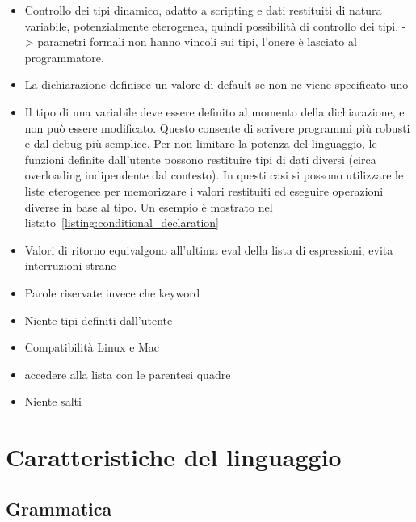 \documentclass[10pt]{article}
\begin{document}
\begin{itemize}
	\item Controllo dei tipi dinamico, adatto a scripting e dati restituiti di natura variabile, potenzialmente eterogenea, quindi possibilità di controllo dei tipi. -> parametri formali non hanno vincoli sui tipi, l'onere è lasciato al programmatore.
	\item La dichiarazione definisce un valore di default se non ne viene specificato uno
	\item Il tipo di una variabile deve essere definito al momento della dichiarazione, e non può essere modificato. Questo consente di scrivere programmi più robusti e dal debug più semplice.
	Per non limitare la potenza del linguaggio, le funzioni definite dall'utente possono restituire tipi di dati diversi (circa overloading indipendente dal contesto). In questi casi si possono utilizzare le liste eterogenee per memorizzare i valori restituiti ed eseguire operazioni diverse in base al tipo. Un esempio è mostrato nel listato~\ref{listing:conditional_declaration}
	\item Valori di ritorno equivalgono all'ultima eval della lista di espressioni, evita interruzioni strane
	\item Parole riservate invece che keyword
	\item Niente tipi definiti dall'utente
	\item Compatibilità Linux e Mac
	\item accedere alla lista con le parentesi quadre
	\item Niente salti~\cite{dijkstra1968letters}

\end{itemize}




\section{Caratteristiche del linguaggio}\label{section:caratteristiche-linguaggio}

\subsection{Grammatica}
\end{document}
